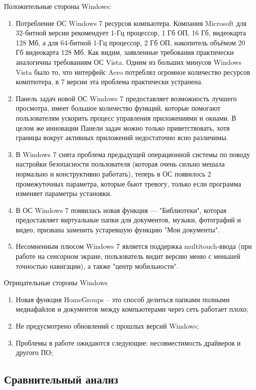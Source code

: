 \documentclass[14pt]{article}
\begin{document}
    Положительные стороны Windows:
    \begin{enumerate}
        \item Потребление ОС Windows 7 ресурсов компьютера. Компания Microsoft для 32-битной версии рекомендует 1-Гц процессор, 1 Гб ОП, 16 Гб, видеокарта 128 Мб, а для 64-битной 1-Гц процессор, 2 Гб ОП, накопитель объёмом 20 Гб видеокарта 128 Мб. Как видим, заявленные требования практически аналогичны требованиям ОС Vista. Одним из больших минусов Windows Vista было то, что интерфейс Aero потреблял огромное количество ресурсов комптютера, в 7 версии эта проблема практически устранена.
        \item Панель задач новой ОС Windows 7 предоставляет возможность лучшего просмотра, имеет большое количество функций, которые помогают пользователям ускорить процесс управления приложениями и окнами. В целом же инновации Панели задач можно только приветствовать, хотя границы вокруг активных приложений недостаточно ясно различимы.
        \item  В Windows 7 снята проблема предыдущей операционной системы по поводу настройки безопасности пользователя (которая очень сильно мешала нормально и конструктивно работать), теперь в ОС появилось 2 промежуточных параметра, которые бьют тревогу, только если программа изменяет параметры установки.
        \item В ОС Windows 7 появилась новая функция --- "Библиотеки", которая предоставляет виртуальные папки для документов, музыки, фотографий и видео, призвана заменить устаревшую функцию "Мои документы".
        \item Несомненным плюсом Windows 7 является поддержка multitouch-ввода (при работе на сенсорном экране, пользователь видит версию меню с меньшей точностью навигации), а также "центр мобильности".
    \end{enumerate}

    Отрицательные стороны Windows
    \begin{enumerate}
        \item Новая функция HomeGroups – это способ делиться папками полными медиафайлов и документов между компьютерами через сеть работает плохо;
        \item Не предусмотрено обновлений с прошлых версий Windows;
        \item Проблемы в работе ожидаются следующие: несовместимость драйверов и другого ПО;
    \end{enumerate}

    \newpage
    \subsection{Сравнительный анализ}
\end{document}
